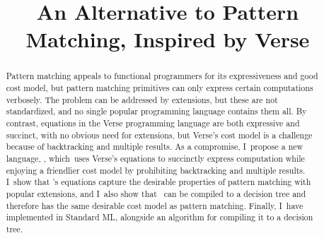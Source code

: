 \documentclass[manuscript,screen,review, 12pt, nonacm]{acmart}
\title{An Alternative to Pattern Matching, Inspired by Verse}
\begin{document}
\begin{abstract}
    Pattern matching appeals to functional programmers for its expressiveness
    and good cost model, but pattern matching primitives can only express
    certain computations verbosely. The problem can be addressed by extensions,
    but these are not standardized, and no single popular programming language
    contains them all. By contrast, equations in the Verse programming language
    are both expressive and succinct, with no obvious need for extensions, but
    Verse's cost model is a challenge because of backtracking and multiple
    results. As a compromise, I~propose a new language, \VMinus, which~uses
    Verse's equations to succinctly express computation while enjoying a
    friendlier cost model by prohibiting backtracking and multiple results.
    I~show that \VMinus's equations capture the desirable properties of pattern
    matching with popular extensions, and I~also show that \VMinus~can be
    compiled to a decision tree and therefore has the same desirable cost model
    as pattern matching. Finally, I~have implemented \VMinus in Standard ML,
    alongside an algorithm for compiling it to a decision tree. 
\end{abstract}

\maketitle
\end{document}
